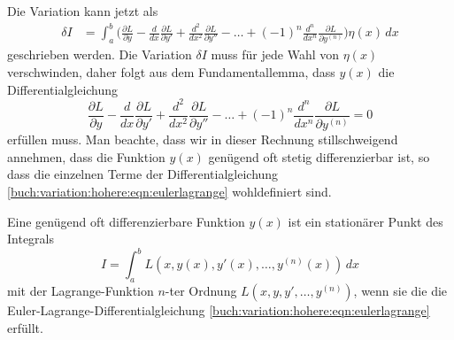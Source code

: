 Die Variation kann jetzt als
\begin{align*}
\delta I
&=
\int_a^b
\biggl(
\frac{\partial L}{\partial y}
-
\frac{d}{dx}
\frac{\partial L}{\partial y'}
+
\frac{d^2}{dx^2}
\frac{\partial L}{\partial y''}
-
\dots
+
(-1)^n
\frac{d^n}{dx^n}
\frac{\partial L}{\partial y^{(n)}}
\biggr)
\eta(x)\,dx
\end{align*}
geschrieben werden.
Die Variation $\delta I$ muss für jede Wahl von $\eta(x)$ verschwinden,
daher folgt aus dem Fundamentallemma, dass $y(x)$ die Differentialgleichung
\begin{equation}
\frac{\partial L}{\partial y}
-
\frac{d}{dx}
\frac{\partial L}{\partial y'}
+
\frac{d^2}{dx^2}
\frac{\partial L}{\partial y''}
-
\dots
+
(-1)^n
\frac{d^n}{dx^n}
\frac{\partial L}{\partial y^{(n)}}
=
0
\label{buch:variation:hohere:eqn:eulerlagrange}
\end{equation}
erfüllen muss.
Man beachte, dass wir in dieser Rechnung stillschweigend annehmen,
dass die Funktion $y(x)$ genügend oft stetig differenzierbar ist,
so dass die einzelnen Terme der Differentialgleichung
\eqref{buch:variation:hohere:eqn:eulerlagrange} wohldefiniert sind.

\begin{satz}
Eine genügend oft differenzierbare Funktion $y(x)$ ist ein stationärer
Punkt des Integrals
\[
I
=
\int_a^b
L(x,y(x),y'(x),\dots,y^{(n)}(x))
\,dx
\]
mit der Lagrange-Funktion $n$-ter Ordnung $L(x,y,y',\dots,y^{(n)})$,
wenn sie die die Euler-Lagrange-Differentialgleichung
\eqref{buch:variation:hohere:eqn:eulerlagrange} erfüllt.
\end{satz}


